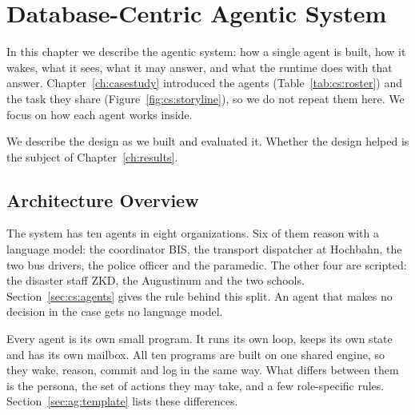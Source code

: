 \chapter{Database-Centric Agentic System}
\label{ch:agentic}


In this chapter we describe the agentic system: how a single agent is built,
how it wakes, what it sees, what it may answer, and what the runtime does with
that answer. Chapter~\ref{ch:casestudy} introduced the agents
(Table~\ref{tab:cs:roster}) and the task they share
(Figure~\ref{fig:cs:storyline}), so we do not repeat them here. We focus on how
each agent works inside.

We describe the design as we built and evaluated it. Whether the design helped
is the subject of Chapter~\ref{ch:results}.

\section{Architecture Overview}
\label{sec:ag:overview}

The system has ten agents in eight organizations. Six of them reason with a
language model: the coordinator BIS, the transport dispatcher at Hochbahn, the
two bus drivers, the police officer and the paramedic. The other four are
scripted: the disaster staff ZKD, the Augustinum and the two schools.
Section~\ref{sec:cs:agents} gives the rule behind this split. An agent that
makes no decision in the case gets no language model.

Every agent is its own small program. It runs its own loop, keeps its own state
and has its own mailbox. All ten programs are built on one shared engine, so
they wake, reason, commit and log in the same way. What differs between them
is the persona, the set of actions they may take, and a few role-specific
rules. Section~\ref{sec:ag:template} lists these differences.


